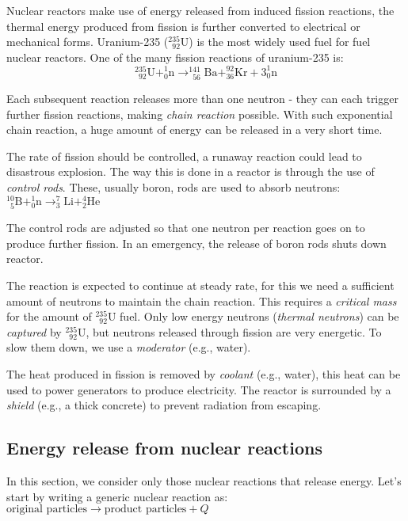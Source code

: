 Nuclear reactors make use of energy released from induced fission reactions, the thermal energy produced from fission is further converted to electrical or mechanical forms. Uranium-235 ($^{235}_{\phantom{1}92}\text{U}$) is the most widely used fuel for fuel nuclear reactors. 
One of the many fission reactions of uranium-235 is: $$^{235}_{\phantom{1}92}\text{U} + ^1_0\text{n} \longrightarrow  ^{141}_{\phantom{1}56}\text{Ba} + ^{92}_{36}\text{Kr} + 3^1_0\text{n}$$

Each subsequent reaction releases more than one neutron - they can each trigger further fission reactions, making \emph{chain reaction} possible. With such exponential chain reaction, a huge amount of energy can be released in a very short time.

The rate of fission should be controlled, a runaway reaction could lead to disastrous explosion. The way this is done in a reactor is through the use of \emph{control rods}. These, usually boron, rods are used to absorb neutrons: $^{10}_{\phantom{1}5}\text{B} + ^1_0\text{n} \longrightarrow  ^{7}_{3}\text{Li} + ^{4}_{2}\text{He}$

The control rods are adjusted so that one neutron per reaction goes on to produce further fission. In an emergency, the release of boron rods shuts down reactor.

The reaction is expected to continue at steady rate, for this we need a sufficient amount of neutrons to maintain the chain reaction. This requires a \emph{critical mass} for the amount of $^{235}_{\phantom{1}92}\text{U}$ fuel. Only low energy neutrons (\emph{thermal neutrons}) can be \emph{captured} by $^{235}_{\phantom{1}92}\text{U}$, but neutrons released through fission are very energetic. To slow them down, we use a  \emph{moderator} (e.g., water).

The heat produced in fission is removed by \emph{coolant} (e.g., water), this heat can be used to power generators to produce electricity. The reactor is surrounded by a \emph{shield} (e.g., a thick concrete) to prevent radiation from escaping.

\subsection{Energy release from nuclear reactions}

In this section, we consider only those nuclear reactions that release energy. Let's start by writing a generic nuclear reaction as: $\text{original particles} \longrightarrow \text{product particles} + Q$

